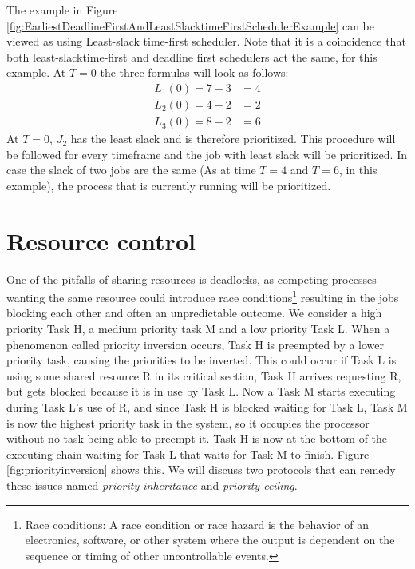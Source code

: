 The example in Figure \ref{fig:EarliestDeadlineFirstAndLeastSlacktimeFirstSchedulerExample} can be viewed as using Least-slack time-first scheduler. Note that it is a coincidence that both least-slacktime-first and deadline first schedulers act the same, for this example. At $T=0$ the three formulas will look as follows:
\begin{align}
	L_1(0)=7-3&=4 \\
	L_2(0)=4-2&=2 \\
	L_3(0)=8-2&=6
\end{align}
At $T=0$, $J_2$ has the least slack and is therefore prioritized. This procedure will be followed for every timeframe and the job with least slack will be prioritized. In case the slack of two jobs are the same (As at time $T=4$ and $T=6$, in this example), the process that is currently running will be prioritized.

\section{Resource control}

One of the pitfalls of sharing resources is deadlocks, as competing processes wanting the same resource could introduce race conditions\footnote{Race conditions: A race condition or race hazard is the behavior of an electronics, software, or other system where the output is dependent on the sequence or timing of other uncontrollable events.} resulting in the jobs blocking each other and often an unpredictable outcome. We consider a high priority Task H, a medium priority task M and a low priority Task L. When a phenomenon called priority inversion occurs, Task H is preempted by a lower priority task, causing the priorities to be inverted. This could occur if Task L is using some shared resource R in its critical section, Task H arrives requesting R, but gets blocked because it is in use by Task L. Now a Task M starts executing during Task L's use of R, and since Task H is blocked waiting for Task L, Task M is now the highest priority task in the system, so it occupies the processor without no task being able to preempt it. Task H is now at the bottom of the executing chain waiting for Task L that waits for Task M to finish. Figure \ref{fig:priorityinversion} shows this.  We will discuss two protocols that can remedy these issues named \textit{priority inheritance} and \textit{priority ceiling}.

